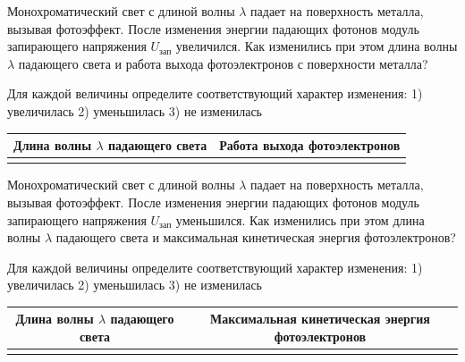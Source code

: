 \begin{taskbasic}[code={\label{task:photo_u_inc_lambda_and_work}}]
Монохроматический свет с длиной волны $\lambda$ падает на поверхность металла, вызывая фотоэффект. После изменения энергии падающих фотонов модуль запирающего напряжения $U_{\text{зап}}$ увеличился. Как изменились при этом длина волны $\lambda$ падающего света и работа выхода фотоэлектронов с поверхности металла?

Для каждой величины определите соответствующий характер изменения:
1) увеличилась
2) уменьшилась
3) не изменилась

\nopagebreak\smallskip
\begin{center}
\small
\begin{tabular}{|c|c|}
\hline
Длина волны $\lambda$ падающего света & Работа выхода фотоэлектронов \\ \hline
 & \\ \hline
\end{tabular}
\end{center}

\end{taskbasic}

\begin{taskbasic}[code={\label{task:photo_u_dec_lambda_and_ek}}]
Монохроматический свет с длиной волны $\lambda$ падает на поверхность металла, вызывая фотоэффект. После изменения энергии падающих фотонов модуль запирающего напряжения $U_{\text{зап}}$ уменьшился. Как изменились при этом длина волны $\lambda$ падающего света и максимальная кинетическая энергия фотоэлектронов?

Для каждой величины определите соответствующий характер изменения:
1) увеличилась
2) уменьшилась
3) не изменилась

\nopagebreak\smallskip
\begin{center}
\small
\begin{tabular}{|c|c|}
\hline
Длина волны $\lambda$ падающего света & Максимальная кинетическая энергия фотоэлектронов \\ \hline
 & \\ \hline
\end{tabular}
\end{center}

\end{taskbasic}
